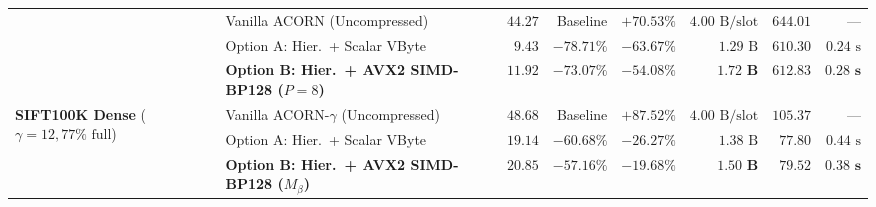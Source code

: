 \begin{table}[t]
\begin{tabular}{@{}llrrrrrr@{}}
 & Vanilla ACORN (Uncompressed) & $44.27$ & Baseline & $+70.53\%$ & $4.00\text{ B/slot}$ & $644.01$ & --- \\
 & Option A: Hier.\ + Scalar VByte & $9.43$ & $-78.71\%$ & $-63.67\%$ & $1.29\text{ B}$ & $610.30$ & $0.24\text{ s}$ \\
 & \textbf{Option B: Hier.\ + AVX2 SIMD-BP128 ($P=8$)} & $\mathbf{11.92}$ & $\mathbf{-73.07\%}$ & $\mathbf{-54.08\%}$ & $\mathbf{1.72\text{ B}}$ & $\mathbf{612.83}$ & $\mathbf{0.28\text{ s}}$ \\
\midrule
\multirow{3}{*}{\textbf{SIFT100K Dense} ($\gamma=12, 77\%\text{ full}$)}
 & Vanilla ACORN-$\gamma$ (Uncompressed) & $48.68$ & Baseline & $+87.52\%$ & $4.00\text{ B/slot}$ & $105.37$ & --- \\
 & Option A: Hier.\ + Scalar VByte & $19.14$ & $-60.68\%$ & $-26.27\%$ & $1.38\text{ B}$ & $77.80$ & $0.44\text{ s}$ \\
 & \textbf{Option B: Hier.\ + AVX2 SIMD-BP128 ($M_\beta$)} & $\mathbf{20.85}$ & $\mathbf{-57.16\%}$ & $\mathbf{-19.68\%}$ & $\mathbf{1.50\text{ B}}$ & $\mathbf{79.52}$ & $\mathbf{0.38\text{ s}}$ \\
\bottomrule
\end{tabular}
\end{table}

